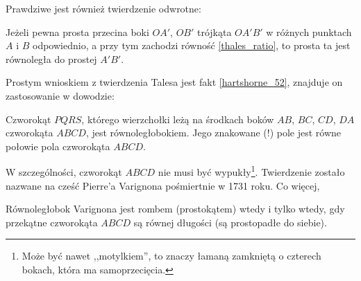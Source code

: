Prawdziwe jest również twierdzenie odwrotne:

\begin{proposition}
    Jeżeli pewna prosta przecina boki $OA'$, $OB'$ trójkąta $OA'B'$ w różnych punktach $A$ i $B$ odpowiednio, a przy tym zachodzi równość \ref{thales_ratio}, to prosta ta jest równoległa do prostej $A'B'$.
\end{proposition}

Prostym wnioskiem z twierdzenia Talesa jest fakt \ref{hartshorne_52}, znajduje on zastosowanie w dowodzie:

\begin{theorem}[Varignona]
    \label{theorem_varignon}
    Czworokąt $PQRS$, którego wierzchołki leżą na środkach boków $AB$, $BC$, $CD$, $DA$ czworokąta $ABCD$, jest równoległobokiem.
    Jego znakowane  (!) pole jest równe połowie pola czworokąta $ABCD$. %
\end{theorem}



W szczególności, czworokąt $ABCD$ nie musi być wypukły\footnote{Może być nawet ,,motylkiem'', to znaczy łamaną zamkniętą o czterech bokach, która ma samoprzecięcia.}.
Twierdzenie zostało nazwane na cześć Pierre'a Varignona pośmiertnie w 1731 roku.
%
Co więcej,

\begin{proposition}
    Równoległobok Varignona jest rombem (prostokątem) wtedy i tylko wtedy, gdy przekątne czworokąta $ABCD$ są równej długości (są prostopadłe do siebie).
%
%
%
\end{proposition}

%